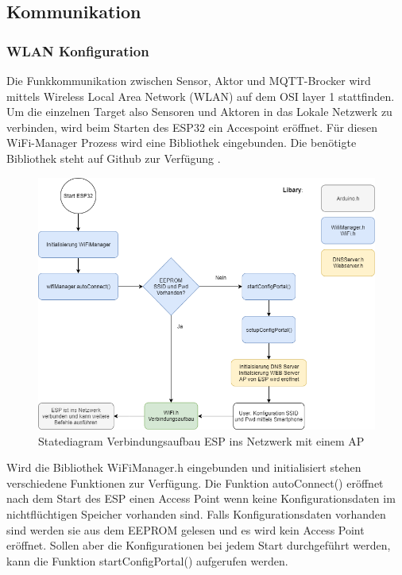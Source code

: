 \subsection{Kommunikation}\label{subsec: Kommunikation}
\subsubsection{WLAN Konfiguration}\label{subsub: Wlan Konfiguration}
Die Funkkommunikation zwischen Sensor, Aktor und MQTT-Brocker wird mittels Wireless Local Area Network (WLAN) auf dem OSI layer 1 stattfinden. Um die einzelnen Target also Sensoren und Aktoren in das Lokale Netzwerk zu verbinden, wird beim Starten des ESP32 ein Accespoint eröffnet. Für diesen WiFi-Manager Prozess wird eine Bibliothek eingebunden. Die benötigte Bibliothek steht auf Github zur Verfügung \cite{zhouhan0126_zhouhan0126/wifimanager-esp32_2019}. 

\begin{figure}[H]
	\centering
	\includegraphics[width=\textwidth]{graphics/statediagramWiFi.png}
	\caption{Statediagram Verbindungsaufbau ESP ins Netzwerk mit einem AP}
	\label{pic: statediagramWiFi}
\end{figure}   

Wird die Bibliothek WiFiManager.h eingebunden und initialisiert stehen verschiedene Funktionen zur Verfügung. Die Funktion autoConnect() eröffnet nach dem Start des ESP einen Access Point wenn keine Konfigurationsdaten im nichtflüchtigen Speicher vorhanden sind. Falls Konfigurationsdaten vorhanden sind werden sie aus dem EEPROM gelesen und es wird kein Access Point eröffnet. Sollen aber die Konfigurationen bei jedem Start durchgeführt werden, kann die Funktion startConfigPortal() aufgerufen werden.   


